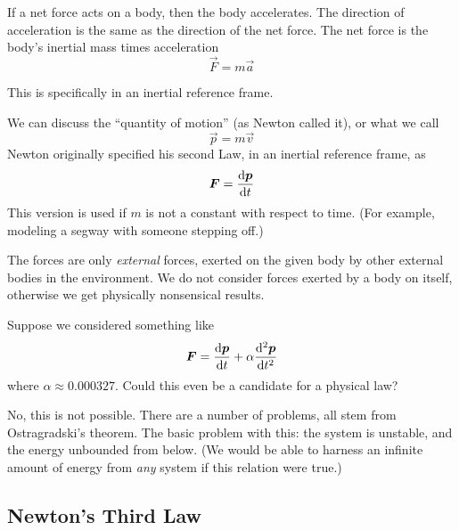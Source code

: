 \label{M:newton:second}
If a net force acts on a body, then the body accelerates. The direction
of acceleration is the same as the direction of the net force. The net
force is the body's inertial mass times acceleration
\begin{equation}
  \vec{F} = m\vec{a}
\end{equation}
\begin{remark}
  This is specifically in an inertial reference frame.
\end{remark}
\begin{remark}
  We can discuss the ``quantity of motion'' (as Newton called it), or
  what we call 
  \begin{equation}
    \vec{p} = m\vec{v}
  \end{equation}
  Newton originally specified his second Law, in an inertial reference
  frame, as
  \begin{equation}
    \vec{F} = \frac{\D\vec{p}}{\D t}
  \end{equation}
  This version is used if $m$ is not a constant with respect to
  time. (For example, modeling a segway with someone stepping off.)
\end{remark}
\begin{remark}
The forces are only \emph{external} forces, exerted on the given body by
other external bodies in the environment. We do not consider forces
exerted by a body on itself, otherwise we get physically nonsensical
results.
\end{remark}

Suppose we considered something like
\begin{equation}
\vec{F} = \frac{\D\vec{p}}{\D t} + \alpha\frac{\D^{2}\vec{p}}{\D t^{2}}
\end{equation}
where $\alpha\approx 0.000327$. Could this even be a candidate for a
physical law?

No, this is not possible. There are a number of problems, all stem from
Ostragradski's theorem. The basic problem with this: the system is
unstable, and the energy unbounded from below. (We would be able to
harness an infinite amount of energy from \emph{any} system if this
relation were true.)

\subsection{Newton's Third Law}
